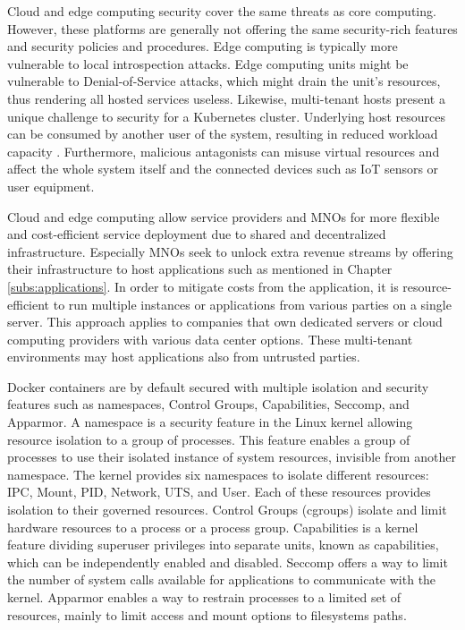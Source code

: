 Cloud and edge computing security cover the same threats as core computing. However, these platforms are generally not offering the same security-rich features and security policies and procedures. Edge computing is typically more vulnerable to local introspection attacks. Edge computing units might be vulnerable to Denial-of-Service attacks, which might drain the unit's resources, thus rendering all hosted services useless. Likewise, multi-tenant hosts present a unique challenge to security for a Kubernetes cluster. Underlying host resources can be consumed by another user of the system, resulting in reduced workload capacity \cite{Edwards2019}. Furthermore, malicious antagonists can misuse virtual resources and affect the whole system itself and the connected devices such as IoT sensors or user equipment. \cite{EdgeComputing5G}\cite{Abbas2018}

Cloud and edge computing allow service providers and MNOs for more flexible and cost-efficient service deployment due to shared and decentralized infrastructure. Especially MNOs seek to unlock extra revenue streams by offering their infrastructure to host applications such as mentioned in Chapter \ref{subs:applications}. In order to mitigate costs from the application, it is resource-efficient to run multiple instances or applications from various parties on a single server. This approach applies to companies that own dedicated servers or cloud computing providers with various data center options. These multi-tenant environments may host applications also from untrusted parties.

Docker containers are by default secured with multiple isolation and security features such as namespaces, Control Groups, Capabilities, Seccomp, and Apparmor. A namespace is a security feature in the Linux kernel allowing resource isolation to a group of processes. This feature enables a group of processes to use their isolated instance of system resources, invisible from another namespace. The kernel provides six namespaces to isolate different resources: IPC, Mount, PID, Network, UTS, and User. Each of these resources provides isolation to their governed resources. Control Groups (cgroups) isolate and limit hardware resources to a process or a process group. Capabilities is a kernel feature dividing superuser privileges into separate units, known as capabilities, which can be independently enabled and disabled. Seccomp offers a way to limit the number of system calls available for applications to communicate with the kernel. Apparmor enables a way to restrain processes to a limited set of resources, mainly to limit access and mount options to filesystems paths. \cite{Flauzac2020} \cite{Gao2017}

